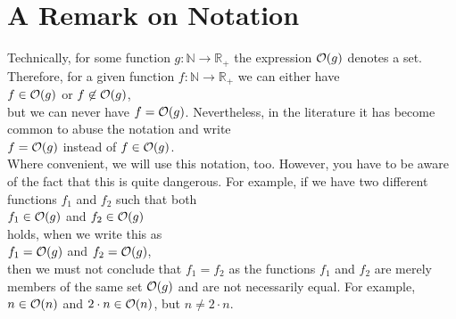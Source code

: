 \section{A Remark on Notation}
Technically, for some function $g:\mathbb{N} \rightarrow \mathbb{R}_+$ the expression $\mathcal{O}(g)$
denotes a set.  Therefore, for a given function $f:\mathbb{N} \rightarrow \mathbb{R}_+$ we can
either have
\\[0.2cm]
\hspace*{1.3cm}
$f \in \mathcal{O}(g)$ \quad or \quad $f \not\in \mathcal{O}(g)$,
\\[0.2cm]
but we can never have $f = \mathcal{O}(g)$.  Nevertheless, in the literature it has become common to abuse the
notation and write
\\[0.2cm]
\hspace*{1.3cm}
$f = \mathcal{O}(g)$ \quad instead of \quad $f \in \mathcal{O}(g)$.
\\[0.2cm]
Where convenient, we will use this notation, too.  However, you have to be aware of the fact that
this is quite dangerous.  For example, if we have two different functions $f_1$ and
$f_2$ such that both
\\[0.2cm]
\hspace*{1.3cm}
$f_1 \in \mathcal{O}(g)$ \quad and \quad $f_2 \in \mathcal{O}(g)$
\\[0.2cm]
holds, when we write this as
\\[0.2cm]
\hspace*{1.3cm}
$f_1 = \mathcal{O}(g)$ \quad and \quad $f_2 = \mathcal{O}(g)$,
\\[0.2cm]
then we must not conclude that $f_1 = f_2$ as the functions $f_1$ and $f_2$ are merely members of
the same set $\mathcal{O}(g)$ and are not necessarily equal.  For example, $n \in \mathcal{O}(n)$ and 
$2 \cdot n \in \mathcal{O}(n)$,  but $n \not= 2 \cdot n$.
\vspace*{0.3cm}

